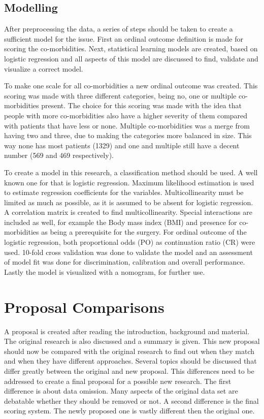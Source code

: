 \documentclass[10pt,a4paper]{article}
\begin{document}
	\subsection{Modelling}
	
	After preprocessing the data, a series of steps should be taken to create a sufficient model for the issue. First an ordinal outcome definition is made for scoring the co-morbidities. Next, statistical learning models are created, based on logistic regression and all aspects of this model are discussed to find, validate and visualize a correct model.
	
	To make one scale for all co-morbidities a new ordinal outcome was created. This scoring was made with three different categories, being no, one or multiple co-morbidities present. The choice for this scoring was made with the idea that people with more co-morbidities also have a higher severity of them compared with patients that have less or none. Multiple co-morbidities was a merge from having two and three, due to making the categories more balanced in size. This way none has most patients (1329) and one and multiple still have a decent number (569 and 469 respectively). 
	
	To create a model in this research, a classification method should be used. A well known one for that is logistic regression. Maximum likelihood estimation is used to estimate regression coefficients for the variables. Multicollinearity must be limited as much as possible, as it is assumed to be absent for logistic regression. A correlation matrix is created to find multicollinearity. Special interactions are included as well, for example the Body mass index (BMI) and presence for co-morbidities as being a prerequisite for the surgery. For ordinal outcome of the logistic regression, both proportional odds (PO) as continuation ratio (CR) were used. 10-fold cross validation was done to validate the model and an assessment of model fit was done for discrimination, calibration and overall performance. Lastly the model is visualized with a nomogram, for further use.
	
	\clearpage
	
	\section{Proposal Comparisons}
	
	A proposal is created after reading the introduction, background and material. The original research is also discussed and a summary is given. This new proposal should now be compared with the original research to find out when they match and when they have different approaches. Several topics should be discussed that differ greatly between the original and new proposal. This differences need to be addressed to create a final proposal for a possible new research. The first difference is about data  omission. Many aspects of the original data set are debatable whether they should be removed or not. A second difference is the final scoring system. The newly proposed one is vastly different then the original one.
	
\end{document}
